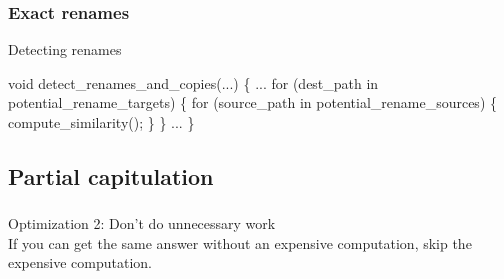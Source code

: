 \documentclass[compress,t]{beamer}
\begin{document}

\begin{frame}[fragile]
  \frametitle{Exact renames}

  \vspace*{-1.5\baselineskip}
  \begin{center}
  \begin{minipage}{0.83\textwidth}
  \begin{block}{Detecting renames}
    {\scriptsize
    \begin{semiverbatim}
void detect_renames_and_copies(...)
\{
    ...
    for (dest_path in potential_rename_targets) \{   
        for (source_path in potential_rename_sources) \{   
            compute_similarity();
        \}
    \}
    ...
\}  \end{semiverbatim}
    }
  \end{block}
  \end{minipage}
  \end{center}



\end{frame}


\subsection[Capitulating]{Partial capitulation}
\begin{frame}
  \frametitle{}

  \vfill
  {\Large
  \begin{center}
    Optimization 2: Don't do unnecessary work\\
    \vspace*{\baselineskip}
    \pause
    If you can get the same answer without an expensive computation,
    skip the expensive computation.
  \end{center}
  }
  \vfill
\end{frame}
\end{document}
